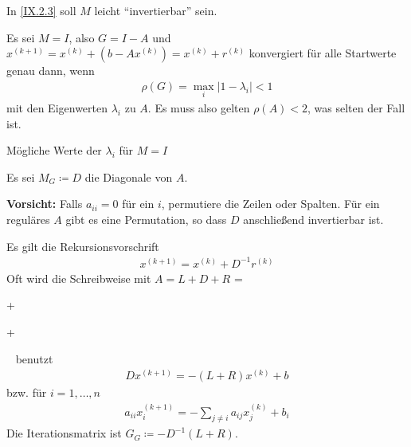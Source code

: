 
In \eqref{IX.2.3} soll $M$ leicht \enquote{invertierbar} sein.

Es sei $M=I$, also $G=I-A$ und
$x^{(k+1)}=x^{(k)}+(b-Ax^{(k)})=x^{(k)}+r^{(k)}$
konvergiert für alle Startwerte genau dann, wenn
\begin{gather}
  \rho(G) = \max_i\left| 1-\lambda_i \right|<1
\label{IX.3.1}
\end{gather}
mit den Eigenwerten $\lambda_i$ zu $A$.
Es muss also gelten $\rho(A) <2$, was selten der Fall ist.

\begin{image}{Mögliche Werte der $\lambda_i$ für $M=I$}
\end{image}\label{im9.3.1}

Es sei $M_G\coloneqq D$ die Diagonale von $A$.

\textbf{Vorsicht:} Falls $a_{ii}=0$ für ein $i$, 
permutiere die Zeilen oder Spalten.
Für ein reguläres $A$ gibt es eine Permutation,
so dass  $D$ anschließend invertierbar ist.

Es gilt die Rekursionsvorschrift
\begin{gather}
  x^{(k+1)}=x^{(k)}+D^{-1}r^{(k)}
\label{IX.3.2}
\end{gather}
Oft wird die Schreibweise mit $A=L+D+R$ =
+
+
~
benutzt
\begin{gather}
  Dx^{(k+1)}= -(L+R)x^{(k)}+b
\label{IX.3.3}
\end{gather}
bzw. für $i=1,\ldots,n$
\begin{gather}
  a_{ii}x_i^{(k+1)} = -\sum_{j\neq i}a_{ij}x_j^{(k)}+b_i
\label{IX.3.4}
\end{gather}
Die Iterationsmatrix ist $G_G\coloneqq -D^{-1}(L+R)$.


